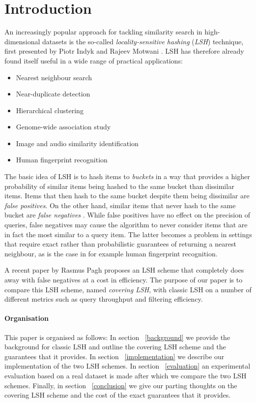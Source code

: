 \section{Introduction}
\label{introduction}

An increasingly popular approach for tackling similarity search in high-dimensional datasets is the so-called \textit{locality-sensitive hashing} (\textit{LSH}) technique, first presented by Piotr Indyk and Rajeev Motwani \cite{DBLP:conf/stoc/IndykM98}. LSH has therefore already found itself useful in a wide range of practical applications:

\begin{itemize}
  \item Nearest neighbour search
  \item Near-duplicate detection
  \item Hierarchical clustering
  \item Genome-wide association study
  \item Image and audio similarity identification
  \item Human fingerprint recognition
\end{itemize}

The basic idea of LSH is to hash items to \textit{buckets} in a way that provides a higher probability of similar items being hashed to the same bucket than dissimilar items. Items that then hash to the same bucket despite them being dissimilar are \textit{false positives}. On the other hand, similar items that never hash to the same bucket are \textit{false negatives} \cite[p. 88]{DBLP:books/cu/LeskovecRU14}. While false positives have no effect on the precision of queries, false negatives may cause the algorithm to never consider items that are in fact the most similar to a query item. The latter becomes a problem in settings that require exact rather than probabilistic guarantees of returning a nearest neighbour, as is the case in for example human fingerprint recognition.

A recent paper by Rasmus Pagh \cite{DBLP:journals/corr/Pagh15} proposes an LSH scheme that completely does away with false negatives at a cost in efficiency. The purpose of our paper is to compare this LSH scheme, named \textit{covering LSH}, with classic LSH on a number of different metrics such as query throughput and filtering efficiency.

\paragraph{Organisation} This paper is organised as follows: In section ~\ref{background} we provide the background for classic LSH and outline the covering LSH scheme and the guarantees that it provides. In section ~\ref{implementation} we describe our implementation of the two LSH schemes. In section ~\ref{evaluation} an experimental evaluation based on a real dataset is made after which we compare the two LSH schemes. Finally, in section ~\ref{conclusion} we give our parting thoughts on the covering LSH scheme and the cost of the exact guarantees that it provides.
